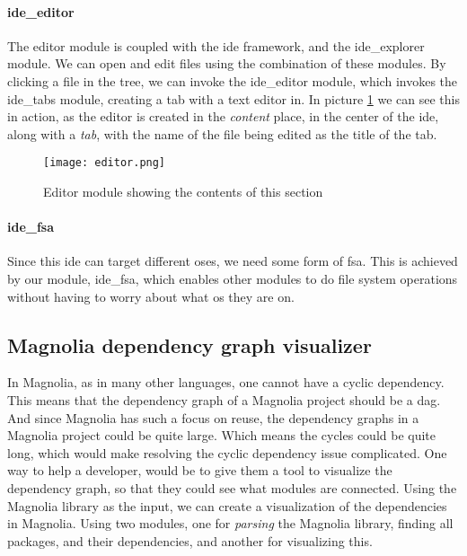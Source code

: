 \paragraph{ide\_editor} The editor module is coupled with the \gls*{ide}
framework, and the ide\_explorer module. We can open and edit files using the
combination of these modules. By clicking a file in the tree, we can invoke the
ide\_editor module, which invokes the ide\_tabs module, creating a tab with a
text editor in. In picture \ref{pic:editorModule} we can see this in action, as
the editor is created in the \textit{content} place, in the center of the
\gls*{ide}, along with a \textit{tab}, with the name of the file being edited as
the title of the tab.

\begin{figure}[H]
  \centering
  \texttt{[image: editor.png]}
  \caption{
    Editor module showing the contents of this section
  }
  \label{pic:editorModule}
\end{figure}

\paragraph{ide\_fsa} Since this \gls*{ide} can target different \gls*{os}es, we
need some form of \gls*{fsa}. This is achieved by our module, ide\_fsa, which
enables other modules to do file system operations without having to worry about
what \gls*{os} they are on.


\subsection{Magnolia dependency graph visualizer}

In Magnolia, as in many other languages, one cannot have a cyclic dependency.
This means that the dependency graph of a Magnolia project should be a
\gls*{dag}. And since Magnolia has such a focus on reuse, the dependency graphs
in a Magnolia project could be quite large. Which means the cycles could be
quite long, which would make resolving the cyclic dependency issue complicated.
One way to help a developer, would be to give them a tool to visualize the
dependency graph, so that they could see what modules are connected. Using the
Magnolia library as the input, we can create a visualization of the dependencies
in Magnolia. Using two modules, one for \textit{parsing} the Magnolia library,
finding all packages, and their dependencies, and another for visualizing
this.


